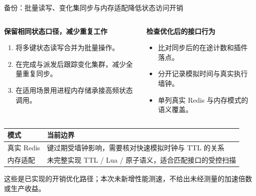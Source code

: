 \documentclass[aspectratio=169,10pt]{beamer}
\newcommand{\src}[1]{\vfill{\fontsize{6.7}{8}\selectfont\color{Muted}#1}\par}
\newcommand{\lead}[1]{{\color{Teal}\large\bfseries #1}\par\medskip}
\begin{document}
\begin{frame}{备份：批量读写、变化集同步与内存适配降低状态访问开销}
\begin{columns}[T]
\begin{column}{.48\textwidth}
\lead{保留相同状态口径，减少重复工作}
\begin{enumerate}
\item 将多键状态读写合并为批量操作。
\item 在完成与派发后跟踪变化集群，减少全量重复同步。
\item 在适用场景用进程内存储承接高频状态调用。
\end{enumerate}
\end{column}
\begin{column}{.47\textwidth}
\lead{检查优化后的接口行为}
\begin{itemize}
\item 比对同步后的在途计数和插件落点。
\item 分开记录模拟时间与真实执行墙钟。
\item 单列真实 Redis 与内存模式的语义覆盖。
\end{itemize}
\end{column}
\end{columns}
\medskip
\renewcommand{\arraystretch}{1.4}
\begin{tabularx}{\textwidth}{@{}p{2.5cm}Y@{}}
\toprule 模式 & 当前边界 \\
\midrule
真实 Redis & 键过期受墙钟影响，需要核对快速模拟时钟与 TTL 的关系 \\
内存适配 & 未完整实现 TTL / Lua / 原子语义，适合匹配接口的受控扫描 \\
\bottomrule
\end{tabularx}
\src{这些是已实现的开销优化路径；本次未新增性能测速，不给出未经测量的加速倍数或生产收益。}
\end{frame}
\end{document}
